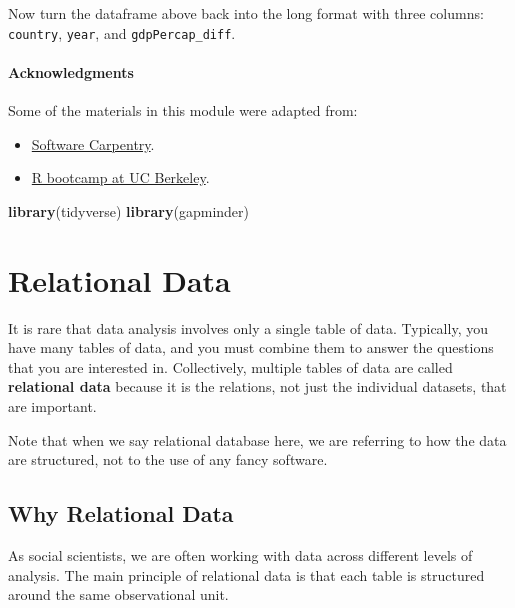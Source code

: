 \documentclass[
]{book}
\newenvironment{Shaded}{\begin{snugshade}}{\end{snugshade}}
\newcommand{\KeywordTok}[1]{\textcolor[rgb]{0.13,0.29,0.53}{\textbf{#1}}}
\newcommand{\NormalTok}[1]{#1}
\providecommand{\tightlist}{%
  \setlength{\itemsep}{0pt}\setlength{\parskip}{0pt}}
\begin{document}
Now turn the dataframe above back into the long format with three columns: \texttt{country}, \texttt{year}, and \texttt{gdpPercap\_diff}.

\hypertarget{acknowledgments-3}{%
\subsubsection*{Acknowledgments}\label{acknowledgments-3}}

Some of the materials in this module were adapted from:

\begin{itemize}
\tightlist
\item
  \href{http://swcarpentry.github.io/r-novice-gapminder/}{Software Carpentry}.
\item
  \href{https://github.com/berkeley-scf/r-bootcamp-fall-2019}{R bootcamp at UC Berkeley}.
\end{itemize}

\begin{Shaded}
\begin{Highlighting}[]
\KeywordTok{library}\NormalTok{(tidyverse)}
\KeywordTok{library}\NormalTok{(gapminder)}
\end{Highlighting}
\end{Shaded}

\hypertarget{relational-data}{%
\chapter{Relational Data}\label{relational-data}}

It is rare that data analysis involves only a single table of data. Typically, you have many tables of data, and you must combine them to answer the questions that you are interested in. Collectively, multiple tables of data are called \textbf{relational data} because it is the relations, not just the individual datasets, that are important.

Note that when we say relational database here, we are referring to how the data are structured, not to the use of any fancy software.

\hypertarget{why-relational-data}{%
\section{Why Relational Data}\label{why-relational-data}}

As social scientists, we are often working with data across different levels of analysis. The main principle of relational data is that each table is structured around the same observational unit.
\end{document}
